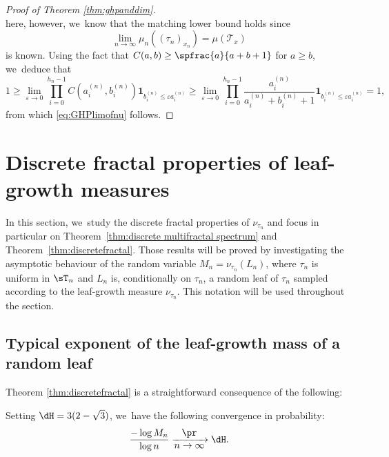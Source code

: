 \begin{proof}[Proof of Theorem \ref{thm:ghpanddim}]
\[\]
here, however, we~know that the matching lower bound holds since\vspace*{-3pt}
\[
\lim_{n \to \infty} \mu_n((\tau_n)_{x_n}) = \mu(\mathcal{T}_x)
\]
is known. Using the fact that $C(a,b) \geq \spfrac{a}{a+b+1}$ for $a \geq b$, we~deduce that\vspace*{-3pt}
\[
1\geq \lim_{\varepsilon \to 0} \prod_{i=0}^{h_n-1} C(a_i^{(n)}, b_i^{(n)})\mathbf{1}_{b_i^{(n)} \leq \varepsilon a_i^{(n)}} \geq \lim_{\varepsilon \to 0} \prod_{i=0}^{h_n-1} \frac{a_i^{(n)}}{a_i^{(n)}+b_i^{(n)}+1}\mathbf{1}_{b_i^{(n)} \leq \varepsilon a_i^{(n)}} = 1,
\]
from which \eqref{eq:GHPlimofnu} follows.
\end{proof}

\section{Discrete fractal properties of leaf-growth measures}
In this section, we~study the discrete fractal properties of $\nu_{\tau_n}$ and focus in particular on Theorem~\ref{thm:discrete multifractal spectrum} and Theorem~\ref{thm:discretefractal}. Those results will be proved by investigating the asymptotic behaviour of the random variable $M_n=\nu_{\tau_n}(L_n)$, where $\tau_n$ is uniform in $\sT_n$ and $L_n$ is, conditionally on $\tau_n$, a random leaf of $\tau_n$ sampled according to the leaf-growth measure $\nu_{\tau_n}$. This notation will be used throughout the section.

\subsection{Typical exponent of the leaf-growth mass of a random leaf}\label{section:discrete Hausdorff}
Theorem \ref{thm:discretefractal} is a straightforward consequence of the following:
\begin{prop}
Setting $\dH=3(2-\sqrt{3})$, we~have the following convergence in probability:\vspace*{-3pt}
\[
\frac{-\log M_n}{\log n} \xrightarrow[\textstyle n\to\infty]{\textstyle\pr}\dH.
\]
\end{prop}


